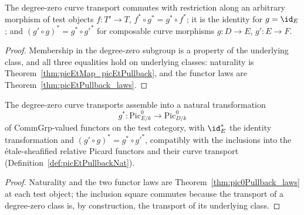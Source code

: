 \begin{theorem}
  \label{thm:pic0Pullback_laws}
  \leanok
  The degree-zero curve transport commutes with restriction along an arbitrary
  morphism of test objects \(f \colon T' \to T\),
  \(f^{*} \circ g^{*} = g^{*} \circ f^{*}\); it is the identity for \(g = \id_E\); and
  \((g' \circ g)^{*} = g^{*} \circ g'^{*}\) for composable curve morphisms
  \(g \colon D \to E\), \(g' \colon E \to F\).
\end{theorem}
\begin{proof}
  \leanok
  Membership in the degree-zero subgroup is a property of the underlying class, and
  all three equalities hold on underlying classes: naturality is
  Theorem~\ref{thm:picEtMap_picEtPullback}, and the functor laws are
  Theorem~\ref{thm:picEtPullback_laws}.
\end{proof}

\begin{definition}
  \label{def:pic0PullbackNat}
  \leanok
  The degree-zero curve transports assemble into a natural transformation
  \[
    g^{*} \colon \mathrm{Pic}^0_{E/k} \longrightarrow \mathrm{Pic}^0_{D/k}
  \]
  of \(\mathrm{CommGrp}\)-valued functors on the test category, with \(\id_E^{*}\) the
  identity transformation and \((g' \circ g)^{*} = g^{*} \circ g'^{*}\), compatibly
  with the inclusions into the \'etale-sheafified relative Picard functors and their
  curve transport (Definition~\ref{def:picEtPullbackNat}).
\end{definition}
\begin{proof}
  \leanok
  Naturality and the two functor laws are Theorem~\ref{thm:pic0Pullback_laws} at each
  test object; the inclusion square commutes because the transport of a degree-zero
  class is, by construction, the transport of its underlying class.
\end{proof}

